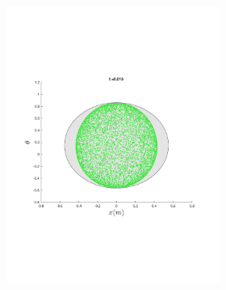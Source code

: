 \begin{figure}
{\begin{subfigure}{0.5\textwidth}
\begin{subfigure}[b]{0.5\textwidth}
        \includegraphics[trim={1cm 7cm 1cm 7cm},
        width=\textwidth]{figures/method/FunnelSimOverlaid3funnel-1y-theta}
      \end{subfigure}%
      \\
      \begin{subfigure}[b]{0.5\textwidth}

\end{subfigure}
\end{subfigure}}
\end{figure}
